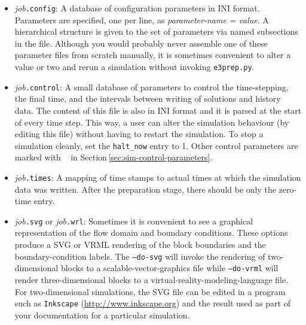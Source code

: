          \begin{itemize}
           \item \textit{job}\texttt{.config}: 
             A database of configuration parameters in INI format.
             Parameters are specified, one per line, as \textit{parameter-name = value}.
             A hierarchical structure is given to the set of parameters via
             named subsections in the file.
             Although you would probably never assemble one of these parameter files
             from scratch manually, it is sometimes convenient to alter a value or two and rerun
             a simulation without invoking \texttt{e3prep.py}.
           \item \textit{job}\texttt{.control}: 
             A small database of parameters to control the time-stepping, the final time,
             and the intervals between writing of solutions and history data.
             The content of this file is also in INI format and it is parsed at the
             start of every time step.
             This way, a user can alter the simulation behaviour (by editing this file)
             without having to restart the simulation.
             To stop a simulation cleanly, set the \texttt{halt\_now} entry to 1.
             Other control parameters are marked with \ddag~ in Section\,\ref{sec:sim-control-parameters}.
           \item  \textit{job}\texttt{.times}:
             A mapping of time stamps to actual times at which the simulation
             data was written.
             After the preparation stage, there should be only the zero-time entry.
           \item \textit{job}\texttt{.svg} or \textit{job}\texttt{.wrl}:  
             Sometimes it is convenient to see a graphical representation of the flow domain 
             and boundary conditions.
             These options produce a SVG or VRML rendering of the block boundaries 
             and the boundary-condition labels.
             The \texttt{--do-svg} will invoke the rendering of two-dimensional blocks
             to a scalable-vector-graphics file while \texttt{--do-vrml} will render 
             three-dimensional blocks to a virtual-reality-modeling-language file.
             For two-dimensional simulations, the SVG file can be edited in a program such as \texttt{Inkscape}
             (\url{http://www.inkscape.org})
             and the result used as part of your documentation for a particular simulation.

\end{itemize}
